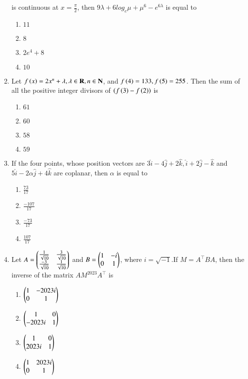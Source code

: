 \documentclass[journal,12pt,onecolumn]{IEEEtran}
\theoremstyle{remark}
\begin{document}
\begin{enumerate}
    is continuous at
    $x=\frac{\pi}{2}$, then $9\lambda+6log_e\mu+\mu^6-e^{6\lambda}$ is equal to 
    \begin{enumerate}
        \item $11$
        \item $8$
        \item $2e^4+8$
        \item $10$
    \end{enumerate}
    \item Let $f\left(x\right)=2x^n+\lambda,\lambda \in \mathbf{R},n \in \mathbf{N}$, and $f\left(4\right)=133, f\left(5\right)=255$. Then the sum of all the positive integer divisors of $\left(f\left(3\right)-f\left(2\right)\right)$ is
    \begin{enumerate}
        \item $61$
        \item $60$
        \item $58$
        \item $59$
    \end{enumerate}
    \item If the four points, whose position vectors are $3\hat{i}-4\hat{j}+2\hat{k},\hat{i}+2\hat{j}-\hat{k}$ and $5\hat{i}-2\alpha\hat{j}+4\hat{k}$ are coplanar, then $\alpha$ is equal to 
    \begin{enumerate}
        \item $\frac{73}{17}$
        \item $\frac{-107}{17}$
        \item $\frac{-73}{17}$
        \item $\frac{107}{17}$
    \end{enumerate}
    \item Let $A=\begin{pmatrix}\frac{1}{\sqrt{10}} & \frac{3}{\sqrt{10}} \\ \frac{-3}{\sqrt{10}} & \frac{1}{\sqrt{10}}\end{pmatrix}$ and $B=\begin{pmatrix}1 & -i\\ 0 &1\end{pmatrix}$, where $i=\sqrt{-1}$.If $M=A^\top BA$, then the inverse of the matrix $AM^{2023}A^\top$ is
    \begin{enumerate}
        \item $\begin{pmatrix}1 & -2023i \\ 0 & 1\end{pmatrix}$
        \item $\begin{pmatrix}1 & 0 \\ -2023i & 1\end{pmatrix}$
        \item $\begin{pmatrix}1 & 0 \\ 2023i & 1\end{pmatrix}$
        \item $\begin{pmatrix}1 & 2023i \\ 0 & 1\end{pmatrix}$

\end{enumerate}
\end{enumerate}
\end{document}
